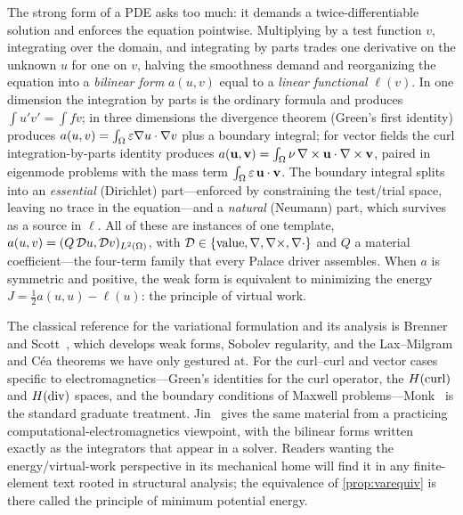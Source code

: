 \summarysection
The strong form of a PDE asks too much: it demands a twice-differentiable
solution and enforces the equation pointwise. Multiplying by a test function $v$,
integrating over the domain, and integrating by parts trades one derivative on
the unknown $u$ for one on $v$, halving the smoothness demand and reorganizing
the equation into a \emph{bilinear form} $a(u,v)$ equal to a \emph{linear
functional} $\ell(v)$. In one dimension the integration by parts is the ordinary
formula and produces $\int u'v'=\int fv$; in three dimensions the divergence
theorem (Green's first identity) produces $a(u,v)=\int_\Omega\varepsilon\nabla
u\cdot\nabla v$ plus a boundary integral; for vector fields the curl
integration-by-parts identity produces $a(\mathbf{u},\mathbf{v})=\int_\Omega\nu\,\nabla\times\mathbf{u}\cdot
\nabla\times\mathbf{v}$, paired in eigenmode problems with the mass term
$\int_\Omega\varepsilon\,\mathbf{u}\cdot\mathbf{v}$. The boundary integral splits into an
\emph{essential} (Dirichlet) part---enforced by constraining the test/trial
space, leaving no trace in the equation---and a \emph{natural} (Neumann) part,
which survives as a source in $\ell$. All of these are instances of one template,
$a(u,v)=(Q\,\mathcal{D} u,\mathcal{D} v)_{L^2(\Omega)}$, with $\mathcal{D}\in\{\text{value},
\nabla,\nabla\times,\nabla\cdot\}$ and $Q$ a material coefficient---the four-term family that
every Palace driver assembles. When $a$ is symmetric and positive, the weak form
is equivalent to minimizing the energy $J=\tfrac12 a(u,u)-\ell(u)$: the principle
of virtual work.

\furtherreading
The classical reference for the variational formulation and its analysis is
Brenner and Scott~\citep{brennerscott2008}, which develops weak forms, Sobolev
regularity, and the Lax--Milgram and C\'ea theorems we have only gestured at.
For the curl--curl and vector cases specific to electromagnetics---Green's
identities for the curl operator, the $H(\mathrm{curl})$ and $H(\mathrm{div})$ spaces, and the
boundary conditions of Maxwell problems---Monk~\citep{monk2003} is the standard
graduate treatment. Jin~\citep{jin2014} gives the same material from a
practicing computational-electromagnetics viewpoint, with the bilinear forms
written exactly as the integrators that appear in a solver. Readers wanting the
energy/virtual-work perspective in its mechanical home will find it in any
finite-element text rooted in structural analysis; the equivalence of
\cref{prop:varequiv} is there called the principle of minimum potential energy.

